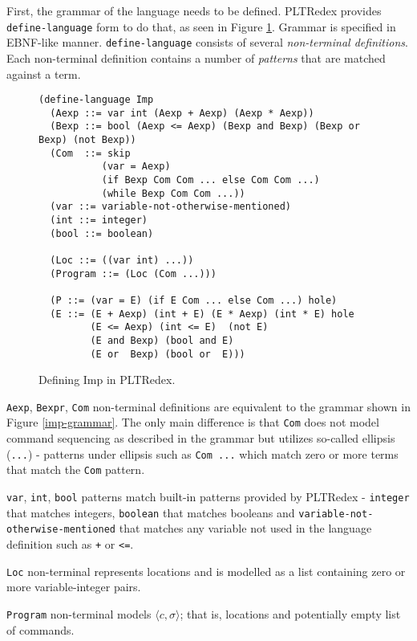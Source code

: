 First, the grammar of the language needs to be defined. PLTRedex provides \texttt{define-language} form to do that, as seen in Figure \ref{imp-define-language}. Grammar is specified in EBNF-like manner. \texttt{define-language} consists of several \textit{non-terminal definitions}. Each non-terminal definition contains a number of \textit{patterns} that are matched against a term. 

\begin{figure}[H]
\begin{verbatim}
(define-language Imp
  (Aexp ::= var int (Aexp + Aexp) (Aexp * Aexp))
  (Bexp ::= bool (Aexp <= Aexp) (Bexp and Bexp) (Bexp or Bexp) (not Bexp))
  (Com  ::= skip
           (var = Aexp)
           (if Bexp Com Com ... else Com Com ...)
           (while Bexp Com Com ...))
  (var ::= variable-not-otherwise-mentioned)
  (int ::= integer)
  (bool ::= boolean) 

  (Loc ::= ((var int) ...))
  (Program ::= (Loc (Com ...)))

  (P ::= (var = E) (if E Com ... else Com ...) hole)
  (E ::= (E + Aexp) (int + E) (E * Aexp) (int * E) hole 
         (E <= Aexp) (int <= E)  (not E)     
         (E and Bexp) (bool and E)
         (E or  Bexp) (bool or  E)))
\end{verbatim}
\caption{Defining Imp in PLTRedex.}
\label{imp-define-language}
\end{figure}


\texttt{Aexp}, \texttt{Bexpr}, \texttt{Com} non-terminal definitions are equivalent to the grammar shown in Figure \ref{imp-grammar}. The only main difference is that \texttt{Com} does not model command sequencing as described in the grammar but utilizes so-called ellipsis (\texttt{...}) - patterns under ellipsis such as \texttt{Com ...} which match zero or more terms that match the \texttt{Com} pattern.

\texttt{var}, \texttt{int}, \texttt{bool} patterns match built-in patterns provided by PLTRedex - \texttt{integer} that matches integers, \texttt{boolean} that matches booleans and \texttt{variable-not-otherwise-mentioned} that matches any variable not used in the language definition such as \texttt{+} or \texttt{<=}.

\texttt{Loc} non-terminal represents locations and is modelled as a list containing zero or more variable-integer pairs.

\texttt{Program} non-terminal models $\langle c, \sigma \rangle$; that is, locations and potentially empty list of commands.

